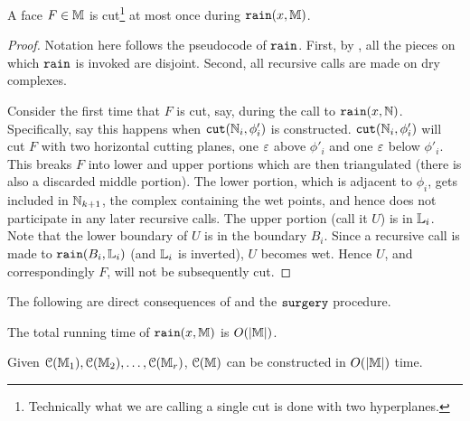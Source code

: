 \begin{lemma}\label{lem:new-verts}
A face $F \in \mathbb{M}$ is cut\footnote{Technically what we are calling a single cut is done with two hyperplanes.} at most once during ${\tt rain}(x,\mathbb{M})$.
\end{lemma}
\begin{proof} Notation here follows the pseudocode of ${\tt rain}$.
First, by , all the pieces on which ${\tt rain}$ is invoked are disjoint.
Second, all recursive calls are made on dry complexes.

Consider the first time that $F$ is cut, say, during the call to ${\tt rain}(x,\mathbb{N})$.
Specifically, say this happens when ${\tt cut}(\mathbb{N}_i,\phi'_i)$ is constructed. 
${\tt cut}(\mathbb{N}_i,\phi'_i)$ will cut $F$ with two horizontal cutting planes, one $\varepsilon$ above $\phi'_i$
and one $\varepsilon$ below $\phi'_i$.  This breaks $F$ into lower and upper portions which are then triangulated
(there is also a discarded middle portion).  The lower portion, which is adjacent to $\phi_i$, gets included 
in $\mathbb{N}_{k+1}$, the complex containing the wet points, and hence does not participate in any later recursive calls.  
The upper portion (call it $U$) is in $\mathbb{L}_i$. Note that the lower
boundary of $U$ is in the boundary $B_i$. Since a recursive call is made to ${\tt rain}(B_i,\mathbb{L}_i)$
(and $\mathbb{L}_i$ is inverted), $U$ becomes wet. Hence $U$, and correspondingly $F$, will not be subsequently cut.
\end{proof}

The following are direct consequences of  and the ${\tt surgery}$ procedure.

\begin{theorem} \label{thm:rain-time} The total running time of ${\tt rain}(x,\mathbb{M})$ is $O(|\mathbb{M}|)$.
\end{theorem}



\begin{claim} \label{clm:rain-reeb} Given ${\cal C}(\mathbb{M}_1), {\cal C}(\mathbb{M}_2), \ldots, {\cal C}(\mathbb{M}_r)$, 
${\cal C}(\mathbb{M})$ can be constructed in $O(|\mathbb{M}|)$ time.
\end{claim}

